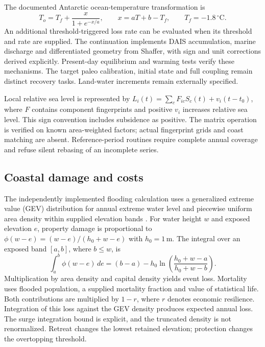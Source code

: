 \documentclass[11pt]{article}
\begin{document}
The documented Antarctic ocean-temperature transformation is
\begin{equation}
T_o=T_f+\frac{x}{1+e^{-x/a}},\qquad
x=aT+b-T_f,\qquad T_f=-1.8\,{}^\circ\mathrm{C}.
\label{eq:anto}
\end{equation}
An additional threshold-triggered loss rate can be evaluated when its threshold
and rate are supplied. The continuation implements DAIS accumulation, marine
discharge and differentiated geometry from Shaffer\cite{shaffer}, with sign and
unit corrections derived explicitly. Present-day equilibrium and warming tests
verify these mechanisms. The target paleo calibration, initial state and full
coupling remain distinct recovery tasks. Land-water increments remain externally specified.

Local relative sea level is represented by
$L_i(t)=\sum_c F_{ic}S_c(t)+v_i(t-t_0)$, where $F$ contains component
fingerprints and positive $v_i$ increases relative sea level. This sign convention
includes subsidence as positive. The matrix operation is verified on known
area-weighted factors; actual fingerprint grids and coast matching are absent.
Reference-period routines require complete annual coverage and refuse silent
rebasing of an incomplete series.

\subsection{Coastal damage and costs}

The independently implemented flooding calculation uses a generalized extreme
value (GEV) distribution for annual extreme water level and piecewise uniform
area density within supplied elevation bands \cite{diaz}. For water height $w$
and exposed elevation $e$, property damage is proportional to
$\phi(w-e)=(w-e)/(h_0+w-e)$ with $h_0=1$\,m. The integral over an exposed
band $[a,b]$, where $b\leq w$, is
\begin{equation}
\int_a^b\phi(w-e)\,de=(b-a)-h_0\ln\!\left(\frac{h_0+w-a}{h_0+w-b}\right).
\end{equation}
Multiplication by area density and capital density yields event loss. Mortality
uses flooded population, a supplied mortality fraction and value of statistical
life. Both contributions are multiplied by $1-r$, where $r$ denotes economic
resilience. Integration of this loss against the GEV density produces expected
annual loss. The surge integration bound is explicit, and the truncated density
is not renormalized. Retreat changes the lowest retained elevation; protection
changes the overtopping threshold.
\end{document}
